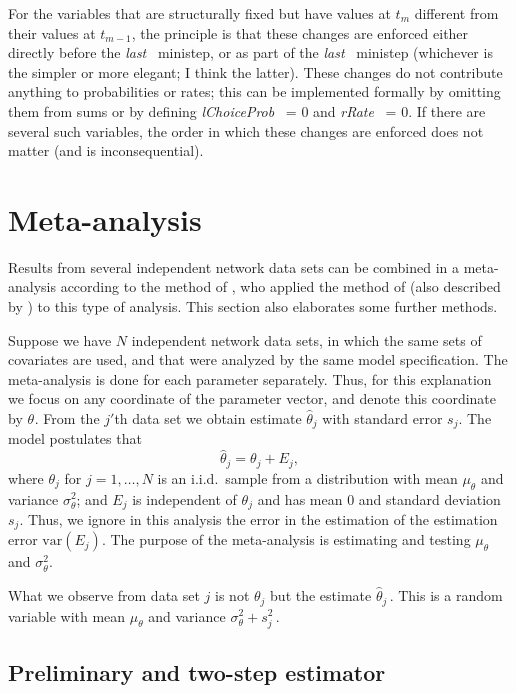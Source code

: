 \documentclass[a4paper,12pt,fleqn]{article}
\newcommand{\var}{\mbox{var}}
\renewcommand{\th}[1]{$\theta_{#1}$}
\newcommand{\nnm}[1]{\textsf{\small\textit{#1}\ }}
\begin{document}
For the variables that are structurally fixed but
have values at $t_m$ different from their
values at $t_{m-1}$, the principle is that these changes are enforced
either directly before the \nnm{last} ministep, or as part of the \nnm{last} ministep
(whichever is the simpler or more elegant;
I think the latter). These changes
do not contribute anything to probabilities or rates; this can be implemented
formally by omitting them from sums or by defining \nnm{lChoiceProb} = 0
and \nnm{rRate} = 0.
If there are several such variables, the order in which these changes are enforced
does not matter (and is inconsequential).

\section{Meta-analysis }
\label{S_meta}

Results from several independent network data sets can be combined
in a meta-analysis according to the method of
\citet{SnijdersBaerveldt03}, who applied the method of \citet{Cochran54}
(also described by \citet{HedgesOlkin85}) to this type of analysis.
This section also elaborates some further methods.

Suppose we have $N$ independent network data sets, in which the
same sets of covariates are used, and that were analyzed
by the same model specification. The meta-analysis is done for
each parameter separately.
Thus, for this explanation we
focus on any coordinate of the parameter vector,
and denote this coordinate by \th{}.
From the $j'$th data set we obtain estimate $\hat\theta_j$
with standard error $s_j$.
The model postulates that
\begin{equation}
 \hat\theta_j = \theta_j + E_j,
\end{equation}
where $\theta_j$ for $j = 1, \ldots, N$ is an i.i.d.\ sample
from a distribution with mean $\mu_\theta$ and variance
$\sigma^2_\theta$; and $E_j$ is independent of $\theta_j$
and has mean 0 and standard deviation $s_j$.
Thus, we ignore in this analysis the error in the estimation
of the estimation error $\var(E_j)$.
The purpose of the meta-analysis is
estimating and testing $\mu_\theta$ and $\sigma^2_\theta$.

What we observe from data set $j$ is not \th{j} but
the estimate ${\hat{\theta}}_j\,$. This is a random variable
with mean $\mu_\theta$ and variance $\sigma^2_\theta + s_j^2\,$.

\subsection{Preliminary and two-step estimator}
\end{document}
